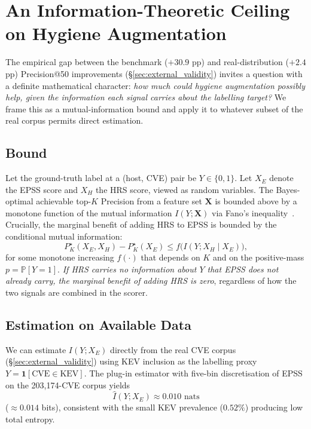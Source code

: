 \section{An Information-Theoretic Ceiling on Hygiene Augmentation}
\label{sec:info_bound}

The empirical gap between the benchmark ($+30.9$ pp) and real-distribution
($+2.4$ pp) Precision@50 improvements (\S\ref{sec:external_validity})
invites a question with a definite mathematical character:
\emph{how much could hygiene augmentation possibly help, given the
information each signal carries about the labelling target?} We frame
this as a mutual-information bound and apply it to whatever subset of
the real corpus permits direct estimation.

\subsection{Bound}

Let the ground-truth label at a (host, CVE) pair be $Y \in \{0, 1\}$.
Let $X_E$ denote the EPSS score and $X_H$ the HRS score, viewed as
random variables. The Bayes-optimal achievable top-$K$ Precision from
a feature set $\mathbf{X}$ is bounded above by a monotone function of
the mutual information $I(Y; \mathbf{X})$ via Fano's
inequality~\cite{cover2006elements}. Crucially, the marginal benefit
of adding HRS to EPSS is bounded by the conditional mutual information:
\begin{equation}
\label{eq:cmi_bound}
P^{\star}_K(X_E, X_H) - P^{\star}_K(X_E)
 \leq f\bigl(I(Y; X_H \mid X_E)\bigr),
\end{equation}
for some monotone increasing $f(\cdot)$ that depends on $K$ and on the
positive-mass $p = \mathbb{P}[Y = 1]$. \emph{If HRS carries no
information about $Y$ that EPSS does not already carry, the marginal
benefit of adding HRS is zero}, regardless of how the two signals are
combined in the scorer.

\subsection{Estimation on Available Data}

We can estimate $I(Y; X_E)$ directly from the real CVE corpus
(\S\ref{sec:external_validity}) using KEV inclusion as the labelling
proxy $Y = \mathbf{1}[\text{CVE} \in \text{KEV}]$. The plug-in
estimator with five-bin discretisation of EPSS on the 203{,}174-CVE
corpus yields
\begin{equation}
\hat I(Y; X_E) \approx 0.010 \text{ nats}
\end{equation}
($\approx 0.014$ bits), consistent with the small KEV prevalence
($0.52\%$) producing low total entropy.

